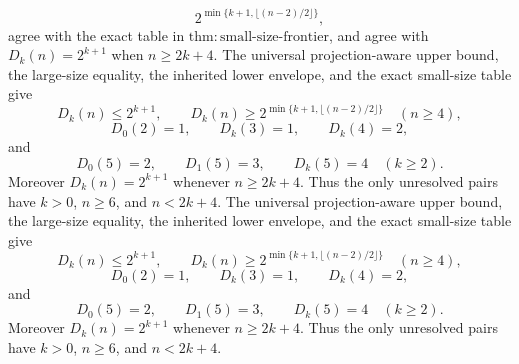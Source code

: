 \[
 2^{\min\{k+1,\lfloor(n-2)/2\rfloor\}},
\]
agree with the exact table in \(\mathrm{thm:small\mbox{-}size\mbox{-}frontier}\), and agree with \(D_k(n)=2^{k+1}\) when \(n\geq2k+4\).
The universal projection-aware upper bound, the large-size equality, the inherited lower envelope, and the exact small-size table give
\[
 D_k(n)\leq2^{k+1},
 \qquad
 D_k(n)\geq2^{\min\{k+1,\lfloor(n-2)/2\rfloor\}}\quad(n\geq4),
\]
\[
 D_0(2)=1,\qquad D_k(3)=1,\qquad D_k(4)=2,
\]
and
\[
 D_0(5)=2,\qquad D_1(5)=3,\qquad D_k(5)=4\quad(k\geq2).
\]
Moreover \(D_k(n)=2^{k+1}\) whenever \(n\geq2k+4\). Thus the only unresolved pairs have \(k>0\), \(n\geq6\), and \(n<2k+4\).
The universal projection-aware upper bound, the large-size equality, the inherited lower envelope, and the exact small-size table give
\[
 D_k(n)\leq2^{k+1},
 \qquad
 D_k(n)\geq2^{\min\{k+1,\lfloor(n-2)/2\rfloor\}}\quad(n\geq4),
\]
\[
 D_0(2)=1,\qquad D_k(3)=1,\qquad D_k(4)=2,
\]
and
\[
 D_0(5)=2,\qquad D_1(5)=3,\qquad D_k(5)=4\quad(k\geq2).
\]
Moreover \(D_k(n)=2^{k+1}\) whenever \(n\geq2k+4\). Thus the only unresolved pairs have \(k>0\), \(n\geq6\), and \(n<2k+4\).
